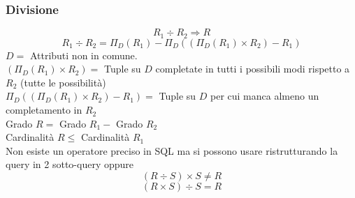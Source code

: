 \subsubsection{Divisione}
$$R_1 \div R_2 \Rightarrow R$$
$$R_1 \div R_2 = \Pi_{D}(R_1) - \Pi_{D}((\Pi_{D}(R_1) \times R_2) - R_1)$$
$D =$ Attributi non in comune.\\
$(\Pi_{D}(R_1) \times R_2) =$ Tuple su $D$ completate in tutti i possibili modi rispetto a $R_2$ (tutte le possibilità)\\
$\Pi_{D}((\Pi_{D}(R_1) \times R_2) - R_1) =$ Tuple su $D$ per cui manca almeno un completamento in $R_2$ \vspace{2mm} \\
Grado $R =$ Grado $R_1 -$ Grado $R_2$\\
Cardinalità $R \leq$ Cardinalità $R_1$\\
Non esiste un operatore preciso in SQL ma si possono usare  ristrutturando la query in 2 sotto-query oppure 
$$(R \div S) \times S \not= R$$
$$(R \times S) \div S = R$$